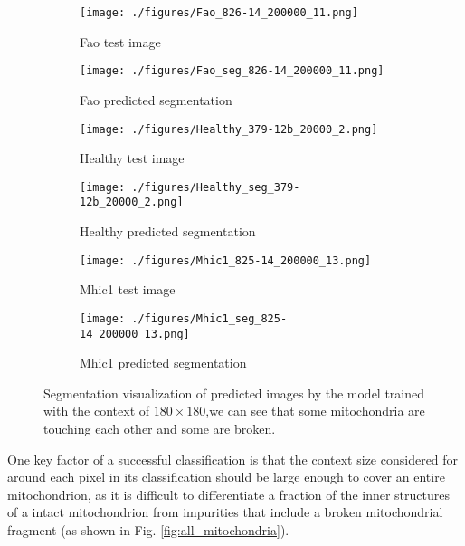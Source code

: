 \begin{figure}[th!]
    \begin{subfigure}{.5\textwidth}
         \centering
        \texttt{[image: ./figures/Fao\_826-14\_200000\_11.png]}
        \caption{Fao test image}
        \label{fig:fao_raw}
    \end{subfigure}
  \begin{subfigure}{.5\textwidth}
        \centering
       \texttt{[image: ./figures/Fao\_seg\_826-14\_200000\_11.png]}
        \caption{Fao predicted segmentation}
        \label{fig:healthy_raw}
    \end{subfigure}
    \begin{subfigure}{.5\textwidth}
        \centering
        \texttt{[image: ./figures/Healthy\_379-12b\_20000\_2.png]}
        \caption{Healthy test image}
        \label{fig:healthy_label}
    \end{subfigure}
    \begin{subfigure}{.5\textwidth}
        \centering
        \texttt{[image: ./figures/Healthy\_seg\_379-12b\_20000\_2.png]}
        \caption{Healthy predicted segmentation}
        \label{fig:healthy_label}
    \end{subfigure}

\begin{subfigure}{.5\textwidth}
        \centering
        \texttt{[image: ./figures/Mhic1\_825-14\_200000\_13.png]}
        \caption{Mhic1 test image}
        \label{fig:healthy_label}
    \end{subfigure}
    \begin{subfigure}{.5\textwidth}
        \centering
        \texttt{[image: ./figures/Mhic1\_seg\_825-14\_200000\_13.png]}
        \caption{Mhic1 predicted segmentation}
        \label{fig:healthy_label}
    \end{subfigure}    
  
  \caption{Segmentation visualization of predicted images by the model trained with the context of $180 \times 180 $,we can see that some mitochondria are touching each other and some are broken.}  
  \label{fig:context_180}  
\end{figure}


One key factor of a successful classification is that the context size considered for
around each pixel in its classification should be large enough to cover an entire
mitochondrion, as it is difficult to differentiate a fraction of the inner structures of a
intact mitochondrion from impurities that include a broken mitochondrial fragment
(as shown in Fig. \ref{fig:all_mitochondria}).

